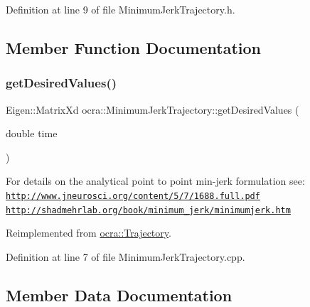 Definition at line 9 of file Minimum\+Jerk\+Trajectory.\+h.



\subsection{Member Function Documentation}
\hypertarget{classocra_1_1MinimumJerkTrajectory_aec9a296591707254657082d550bdb21f}{}\label{classocra_1_1MinimumJerkTrajectory_aec9a296591707254657082d550bdb21f} 
\subsubsection{\texorpdfstring{get\+Desired\+Values()}{getDesiredValues()}}
{\footnotesize\ttfamily Eigen\+::\+Matrix\+Xd ocra\+::\+Minimum\+Jerk\+Trajectory\+::get\+Desired\+Values (\begin{DoxyParamCaption}\item[{double}]{time }\end{DoxyParamCaption})\hspace{0.3cm}{\ttfamily [virtual]}}

For details on the analytical point to point min-\/jerk formulation see\+: \href{http://www.jneurosci.org/content/5/7/1688.full.pdf}{\tt http\+://www.\+jneurosci.\+org/content/5/7/1688.\+full.\+pdf} \href{http://shadmehrlab.org/book/minimum_jerk/minimumjerk.htm}{\tt http\+://shadmehrlab.\+org/book/minimum\+\_\+jerk/minimumjerk.\+htm}

Reimplemented from \hyperlink{classocra_1_1Trajectory_a2102a829e6dad497f7c773c346d499b7}{ocra\+::\+Trajectory}.



Definition at line 7 of file Minimum\+Jerk\+Trajectory.\+cpp.



\subsection{Member Data Documentation}
\hypertarget{classocra_1_1MinimumJerkTrajectory_a59c485dca4c2f2ed0c95809561dfff46}{}\label{classocra_1_1MinimumJerkTrajectory_a59c485dca4c2f2ed0c95809561dfff46} 
